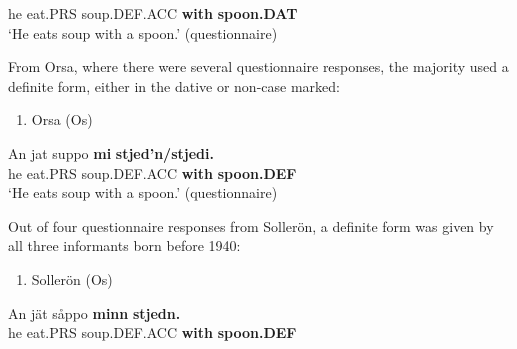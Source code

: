 he  eat.PRS  soup.DEF.ACC  \textbf{with} \textbf{spoon.DAT}\\ %


‘He eats soup with a spoon.’ (questionnaire)
\z


From Orsa, where there were several questionnaire responses, the majority used a definite form, either in the dative or non-case marked:


\begin{enumerate} %
\item 
Orsa (Os)

\end{enumerate} %
\ea\label{}
\gll An  jat  suppo  \textbf{mi}\textbf{  stjed’n/stjedi.}\\


he  eat.PRS  soup.DEF.ACC  \textbf{with} \textbf{spoon.DEF}\\ %


‘He eats soup with a spoon.’ (questionnaire)
\z


Out of four questionnaire responses from Sollerön, a definite form was given by all three informants born before 1940:


\begin{enumerate} %
\item 
Sollerön (Os)

\end{enumerate} %
\ea\label{}
\gll An  jät  såppo  \textbf{minn}\textbf{  stjedn.} \\


he  eat.PRS  soup.DEF.ACC  \textbf{with} \textbf{spoon.DEF} \\ %


